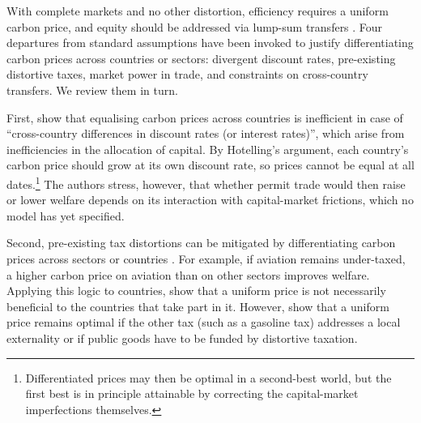 \documentclass[12pt,english]{article}
\theoremstyle{remark}
\begin{document}
With complete markets and no other distortion, %
efficiency requires a uniform carbon price, and equity should be addressed via lump-sum transfers \citep{sandmo_global_2007}. %
Four departures from standard assumptions have been invoked to justify differentiating carbon prices across countries or sectors: divergent discount rates, pre-existing distortive taxes, market power in trade, and constraints on cross-country transfers. We review them in turn.

First, \citet{anthoff_differentiated_2026} show that equalising carbon prices across countries is inefficient in case of ``cross-country differences in discount rates (or interest rates)'', which arise from inefficiencies in the allocation of capital. By Hotelling's argument, each country's carbon price should grow at its own discount rate, so prices cannot be equal at all dates.\footnote{Differentiated prices may then be optimal in a second-best world, but the first best is in principle attainable by correcting the capital-market imperfections themselves.} The authors stress, however, that whether permit trade would then raise or lower welfare depends on its interaction with capital-market frictions, which no model has yet specified.

Second, pre-existing tax distortions can be mitigated by differentiating carbon prices across sectors or countries \citep{babiker_is_2004,boeters_optimally_2014}. For example, if aviation remains under-taxed, a higher carbon price on aviation than on other sectors improves welfare. Applying this logic to countries, \citet{babiker_is_2004} show that a uniform price is not necessarily beneficial to the countries that take part in it. However, \citet{dautume_should_2016} show that a uniform price remains optimal if the other tax (such as a gasoline tax) addresses a local externality or if public goods have to be funded by distortive taxation. %
\end{document}
